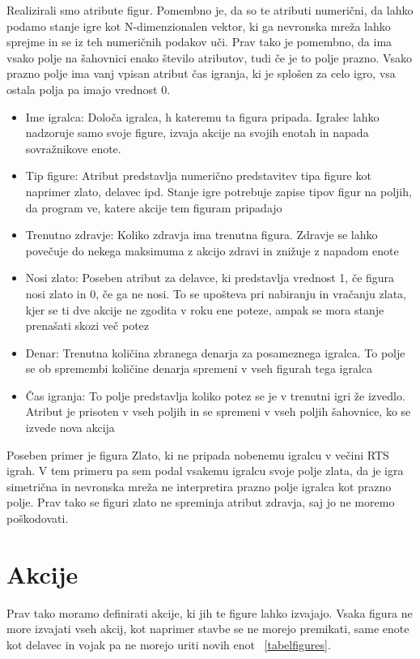 \documentclass[a4paper, 12pt]{book}
\begin{document}
Realizirali smo atribute figur. Pomembno je, da so te atributi numerični, da lahko podamo stanje igre kot N-dimenzionalen vektor, ki ga nevronska mreža lahko sprejme in se iz teh numeričnih podakov uči.
Prav tako je pomembno, da ima vsako polje na šahovnici enako število atributov, tudi če je to polje prazno.
Vsako prazno polje ima vanj vpisan atribut čas igranja, ki je splošen za celo igro, vsa ostala polja pa imajo vrednost 0.
\begin{itemize}
	\item Ime igralca: Določa igralca, h kateremu ta figura pripada. Igralec lahko nadzoruje samo svoje figure, izvaja akcije na svojih enotah in napada sovražnikove enote.
	\item Tip figure: Atribut predstavlja numerično predstavitev tipa figure kot naprimer zlato, delavec ipd. Stanje igre potrebuje zapise tipov figur na poljih, da program ve, katere akcije tem figuram pripadajo
	\item Trenutno zdravje: Koliko zdravja ima trenutna figura. Zdravje se lahko povečuje do nekega maksimuma z akcijo zdravi in znižuje z napadom enote
	\item Nosi zlato: Poseben atribut za delavce, ki predstavlja vrednost 1, če figura nosi zlato in 0, če ga ne nosi. To se upošteva pri nabiranju in vračanju zlata, kjer se ti dve akcije ne zgodita v roku ene poteze, ampak se mora stanje prenašati skozi več potez
	\item Denar: Trenutna količina zbranega denarja za posameznega igralca. To polje se ob spremembi količine denarja spremeni v vseh figurah tega igralca
	\item Čas igranja: To polje predstavlja koliko potez se je v trenutni igri že izvedlo. Atribut je prisoten v vseh poljih in se spremeni v vseh poljih šahovnice, ko se izvede nova akcija
\end{itemize}
Poseben primer je figura Zlato, ki ne pripada nobenemu igralcu v večini RTS igrah. V tem primeru pa sem podal vsakemu igralcu svoje polje zlata, da je igra simetrična in nevronska mreža ne interpretira prazno polje igralca kot prazno polje. Prav tako se figuri zlato ne spreminja atribut zdravja, saj jo ne moremo poškodovati. 

\section{Akcije}
Prav tako moramo definirati akcije, ki jih te figure lahko izvajajo. Vsaka figura ne more izvajati vseh akcij, kot naprimer stavbe se ne morejo premikati, same enote kot delavec in vojak pa ne morejo uriti novih enot ~\ref{tabelfigures}.
\end{document}

